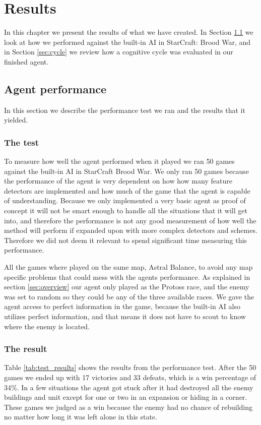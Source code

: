 
\chapter{Results}
In this chapter we present the results of what we have created. In Section \ref{sec:performance} we look at how we performed against the built-in AI in StarCraft: Brood War, and in Section \ref{sec:cycle} we review how a cognitive cycle was evaluated in our finished agent.

\section{Agent performance}
\label{sec:performance}
In this section we describe the performance test we ran and the results that it yielded.
\subsection{The test}
To measure how well the agent performed when it played we ran 50 games against the built-in AI in StarCraft Brood War. We only ran 50 games because the performance of the agent is very dependent on how how many feature detectors are implemented and how much of the game that the agent is capable of understanding. Because we only implemented a very basic agent as proof of concept it will not be smart enough to handle all the situations that it will get into, and therefore the performance is not any good measurement of how well the method will perform if expanded upon with more complex detectors and schemes. Therefore we did not deem it relevant to spend significant time measuring this performance.

All the games where played on the same map, Astral Balance, to avoid any map specific problems that could mess with the agents performance. As explained in section \ref{sec:overview} our agent only played as the Protoss race, and the enemy was set to random so they could be any of the three available races. We gave the agent access to perfect information in the game, because the built-in AI also utilizes perfect information, and that means it does not have to scout to know where the enemy is located.

\subsection{The result}
Table \ref{tab:test_results} shows the results from the performance test. After the 50 games we ended up with 17 victories and 33 defeats, which is a win percentage of 34\%. In a few situations the agent got stuck after it had destroyed all the enemy buildings and unit except for one or two in an expansion or hiding in a corner. These games we judged as a win because the enemy had no chance of rebuilding no matter how long it was left alone in this state.

